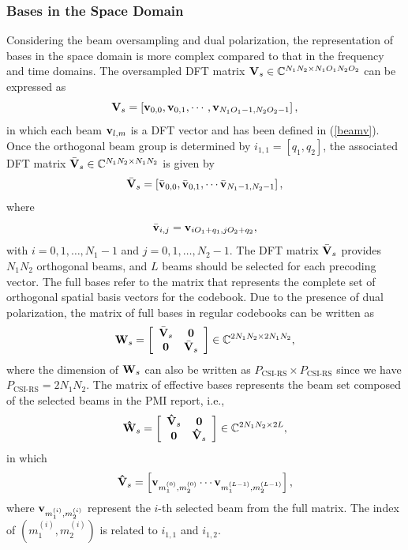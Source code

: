 \documentclass[lettersize,journal]{IEEEtran}
\begin{document}
\subsubsection{Bases in the Space Domain}
Considering the beam oversampling and dual polarization, the representation of bases in the space domain is more complex compared to that in the frequency and time domains. The oversampled DFT matrix ${{\bf{V}}_s}\in \mathbb{C}^{{{N_1}{N_2}} \times {N_1}{O_1}{N_2}{O_2}}$ can be expressed as
\begin{equation}
{{\bf{V}}_s} = \left[{{\bf{v}}_{0,0}},{{\bf{v}}_{0,1}}, \cdots ,{{\bf{v}}_{{N_1}{O_1} - 1,{N_2}{O_2} - 1}}\right],    
\end{equation}
in which each beam ${\bf{v}}_{l,m}$ is a DFT vector and has been defined in (\ref{beamv}). Once the orthogonal beam group is determined by $i_{1,1}=[q_1,q_2]$, the associated DFT matrix ${\bar{\bf{V}} _s} \in \mathbb{C}^{{N_1}{N_2} \times {N_1}{N_2}}$ is given by
\begin{equation}
{\bar{\bf{V}} _s} = \left[ {{{\bar{\bf{v}} }_{0,0}},{{\bar{\bf{v}} }_{0,1}}, \cdots {{\bar{\bf{v}} }_{{N_1} - 1,{N_2} - 1}}} \right],    
\end{equation}
where
\begin{equation}
{\bar{\bf{v}} _{i,j}} = {{\bf{v}}_{i{O_1} + {q_1},j{O_2} + {q_2}}},  
\end{equation}
with $i=0,1,\ldots,N_1-1$ and $j=0,1,\ldots,N_2-1$. The DFT matrix ${\bar{\bf{V}} _s}$ provides $N_1N_2$ orthogonal beams, and $L$ beams should be selected for each precoding vector. The full bases refer to the matrix that represents the complete set of orthogonal spatial basis vectors for the codebook. Due to the presence of dual polarization, the matrix of full bases in regular codebooks can be written as
\begin{equation}
  {{\bf{W}}_s} = \left[ {\begin{array}{*{20}{c}}
{{{\bar{\bf{V}} }_s}}&{\bf{0}}\\
{\bf{0}}&{{{\bar{\bf{V}} }_s}}
\end{array}} \right]\in \mathbb{C}^{2{N_1}{N_2} \times 2{N_1}{N_2}},
\end{equation}
where the dimension of $ {{\bf{W}}_s}$ can also be written as ${P_{{\text{CSI-RS}}}} \times {P_{{\text{CSI-RS}}}}$ since we have ${P_{{\text{CSI-RS}}}}=2N_1N_2$.
The matrix of effective bases represents the beam set composed of the selected beams in the PMI report, i.e., 
\begin{equation}
{{{\bf{\hat W}}}_s} = \left[ {\begin{array}{*{20}{c}}
{{{{\bf{\hat V}}}_s}}&{\bf{0}}\\
{\bf{0}}&{{{{\bf{\hat V}}}_s}}
\end{array}} \right]\in \mathbb{C}^{2{N_1N_2} \times 2L},
\end{equation}
in which
\begin{equation}
{{{\bf{\hat V}}}_s} = \left[ {{{\bf{v}}_{m_1^{(0)},m_2^{(0)}}} \cdots {{\bf{v}}_{m_1^{(L - 1)},m_2^{(L - 1)}}}} \right],
\end{equation}
where ${\bf{v}}_{m_1^{(i)},m_2^{(i)}}$ represent the $i$-th selected beam from the full matrix. The index of $(m_1^{(i)},m_2^{(i)})$ is related to $i_{1,1}$ and $i_{1,2}$.
\end{document}
